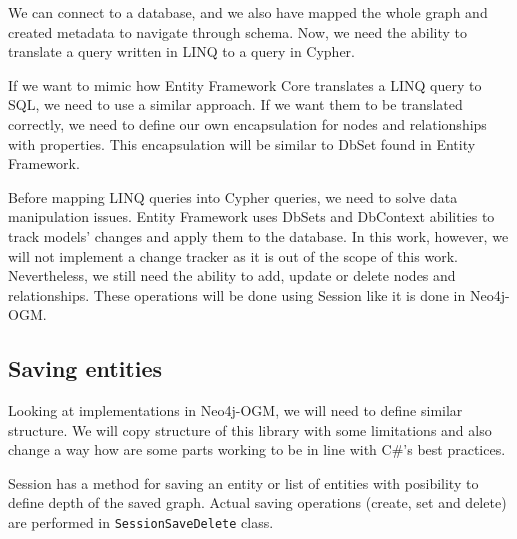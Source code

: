 We can connect to a database, and we also have mapped the whole graph and created metadata to navigate through schema. Now, we need the ability to translate a query written in LINQ to a query in Cypher.

If we want to mimic how Entity Framework Core translates a LINQ query to SQL, we need to use a similar approach. If we want them to be translated correctly, we need to define our own encapsulation for nodes
and relationships with properties. This encapsulation will be similar to DbSet found in Entity Framework.

Before mapping LINQ queries into Cypher queries, we need to solve data manipulation issues. Entity Framework uses DbSets and DbContext abilities to track
models' changes and apply them to the database. In this work, however, we will not implement a change tracker as it is out of the scope of this work. Nevertheless, we still
need the ability to add, update or delete nodes and relationships. These operations will be done using Session like it is done in Neo4j-OGM.

\subsection{Saving entities}

Looking at implementations in Neo4j-OGM, we will need to define similar structure. We will copy structure of this library with some limitations and also
change a way how are some parts working to be in line with C\#'s best practices.

Session has a method for saving an entity or list of entities with posibility to define depth of the saved graph. Actual saving operations (create, set and delete) are performed
in \texttt{SessionSaveDelete} class.
